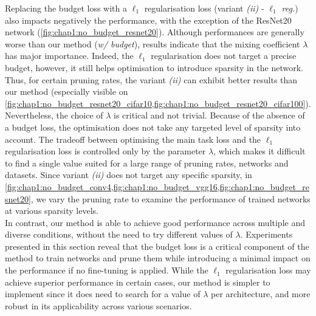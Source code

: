 Replacing the budget loss with a $\ell_1$ regularisation loss (variant
\emph{(ii)} - \emph{$\ell_1$ reg.}) also impacts negatively the performance,
with the exception of the ResNet20 network
(\cref{fig:chap1:no_budget_resnet20}). Although performances are generally worse
than our method (\emph{w/ budget}), results indicate that the mixing coefficient
$\lambda$ has major importance. Indeed, the $\ell_1$ regularisation does not
target a precise budget, however, it still helps optimisation to introduce
sparsity in the network. Thus, for certain pruning rates, the variant
\emph{(ii)} can exhibit better results than our method (especially visible on
\cref{fig:chap1:no_budget_resnet20_cifar10,fig:chap1:no_budget_resnet20_cifar100}).
Nevertheless, the choice of $\lambda$ is critical and not trivial. Because of
the absence of a budget loss, the optimisation does not take any targeted level
of sparsity into account. The tradeoff between optimising the main task loss and
the $\ell_1$ regularisation loss is controlled only by the parameter $\lambda$,
which makes it difficult to find a single value suited for a large range of
pruning rates, networks and datasets. Since variant \emph{(ii)} does not target
any specific sparsity, in
\cref{fig:chap1:no_budget_conv4,fig:chap1:no_budget_vgg16,fig:chap1:no_budget_resnet20},
we vary the pruning rate to examine the performance of trained networks at
various sparsity levels.\\

In contrast, our method is able to achieve good performance across multiple and
diverse conditions, without the need to try different values of $\lambda$.
Experiments presented in this section reveal that the budget loss is a critical
component of the method to train networks and prune them while introducing a
minimal impact on the performance if no fine-tuning is applied. While the
$\ell_1$ regularisation loss may achieve superior performance in certain cases,
our method is simpler to implement since it does need to search for a value of
$\lambda$ per architecture, and more robust in its applicability across various
scenarios.\\

